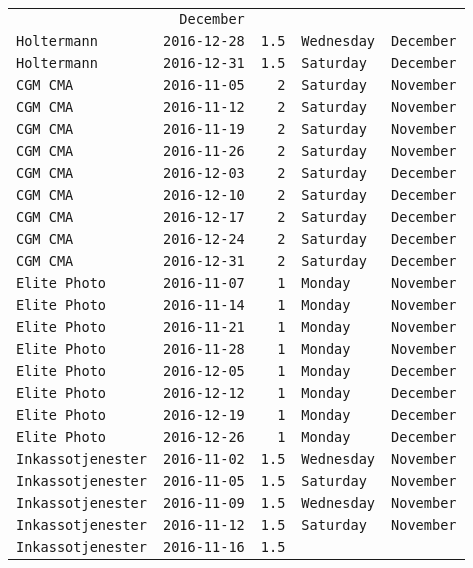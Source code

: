 \documentclass[11pt,A4paper,]{article}
\begin{document}
\begin{longtable}[]{@{}lrrll@{}}
& \texttt{December}\tabularnewline
\texttt{Holtermann} & \texttt{2016-12-28} & \texttt{1.5} &
\texttt{Wednesday} & \texttt{December}\tabularnewline
\texttt{Holtermann} & \texttt{2016-12-31} & \texttt{1.5} &
\texttt{Saturday} & \texttt{December}\tabularnewline
\texttt{CGM\ CMA} & \texttt{2016-11-05} & \texttt{2} & \texttt{Saturday}
& \texttt{November}\tabularnewline
\texttt{CGM\ CMA} & \texttt{2016-11-12} & \texttt{2} & \texttt{Saturday}
& \texttt{November}\tabularnewline
\texttt{CGM\ CMA} & \texttt{2016-11-19} & \texttt{2} & \texttt{Saturday}
& \texttt{November}\tabularnewline
\texttt{CGM\ CMA} & \texttt{2016-11-26} & \texttt{2} & \texttt{Saturday}
& \texttt{November}\tabularnewline
\texttt{CGM\ CMA} & \texttt{2016-12-03} & \texttt{2} & \texttt{Saturday}
& \texttt{December}\tabularnewline
\texttt{CGM\ CMA} & \texttt{2016-12-10} & \texttt{2} & \texttt{Saturday}
& \texttt{December}\tabularnewline
\texttt{CGM\ CMA} & \texttt{2016-12-17} & \texttt{2} & \texttt{Saturday}
& \texttt{December}\tabularnewline
\texttt{CGM\ CMA} & \texttt{2016-12-24} & \texttt{2} & \texttt{Saturday}
& \texttt{December}\tabularnewline
\texttt{CGM\ CMA} & \texttt{2016-12-31} & \texttt{2} & \texttt{Saturday}
& \texttt{December}\tabularnewline
\texttt{Elite\ Photo} & \texttt{2016-11-07} & \texttt{1} &
\texttt{Monday} & \texttt{November}\tabularnewline
\texttt{Elite\ Photo} & \texttt{2016-11-14} & \texttt{1} &
\texttt{Monday} & \texttt{November}\tabularnewline
\texttt{Elite\ Photo} & \texttt{2016-11-21} & \texttt{1} &
\texttt{Monday} & \texttt{November}\tabularnewline
\texttt{Elite\ Photo} & \texttt{2016-11-28} & \texttt{1} &
\texttt{Monday} & \texttt{November}\tabularnewline
\texttt{Elite\ Photo} & \texttt{2016-12-05} & \texttt{1} &
\texttt{Monday} & \texttt{December}\tabularnewline
\texttt{Elite\ Photo} & \texttt{2016-12-12} & \texttt{1} &
\texttt{Monday} & \texttt{December}\tabularnewline
\texttt{Elite\ Photo} & \texttt{2016-12-19} & \texttt{1} &
\texttt{Monday} & \texttt{December}\tabularnewline
\texttt{Elite\ Photo} & \texttt{2016-12-26} & \texttt{1} &
\texttt{Monday} & \texttt{December}\tabularnewline
\texttt{Inkassotjenester} & \texttt{2016-11-02} & \texttt{1.5} &
\texttt{Wednesday} & \texttt{November}\tabularnewline
\texttt{Inkassotjenester} & \texttt{2016-11-05} & \texttt{1.5} &
\texttt{Saturday} & \texttt{November}\tabularnewline
\texttt{Inkassotjenester} & \texttt{2016-11-09} & \texttt{1.5} &
\texttt{Wednesday} & \texttt{November}\tabularnewline
\texttt{Inkassotjenester} & \texttt{2016-11-12} & \texttt{1.5} &
\texttt{Saturday} & \texttt{November}\tabularnewline
\texttt{Inkassotjenester} & \texttt{2016-11-16} & \texttt{1.5} &

\end{longtable}
\end{document}
